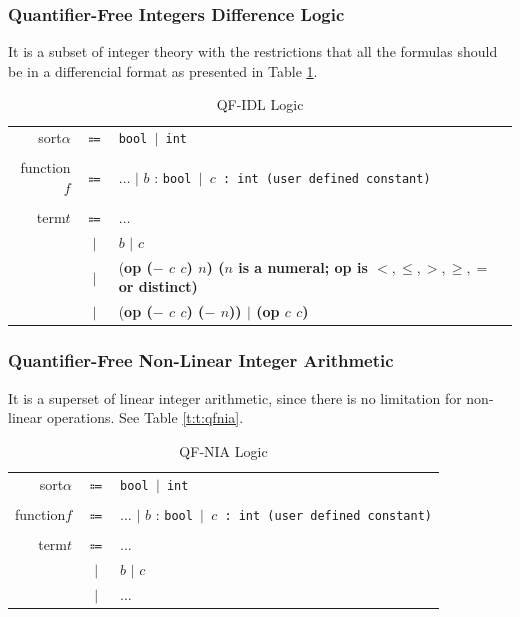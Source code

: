\documentclass[10pt,letter]{article}
\theoremstyle{definition}
\begin{document}
\subsubsection{Quantifier-Free Integers Difference Logic}
It is a subset of integer theory with the restrictions that all the formulas should be in a differencial format as presented in Table \ref{t:qfidllogic}.

\begin{table}[!h]
\begin{mdframed}
\centering
\begin{tabular}{r c l}
sort\qquad $\alpha$ & $\Coloneqq$ & \tt bool $\mid$ int\\
\\
function\qquad $f$ & $\Coloneqq$ & $\ldots$ $\mid$ \rm $b$ : \tt bool $\mid$ \rm $c$ : \tt int \qquad(\rm user defined constant)\\
\\
term\qquad $t$ & $\Coloneqq$ & $\ldots$ \\
& $\mid$ & $b$ $\mid$ $c$\\
& $\mid$ & (\bf op \rm ($-$ $c$ $c$) $n$) \qquad($n$ is a numeral; \bf op \rm is $<, \leqslant, >, \geqslant, =$ or \bf distinct\rm)\\
& $\mid$ & (\bf op \rm ($-$ $c$ $c$) ($-$ $n$)) $\mid$ (\bf op \rm $c$ $c$)\\
\end{tabular}
\end{mdframed}
\caption{QF-IDL Logic}
\label{t:qfidllogic}
\end{table}

\subsubsection{Quantifier-Free Non-Linear Integer Arithmetic}
It is a superset of linear integer arithmetic, since there is no limitation for non-linear operations. See Table \ref{t:t:qfnia}.

\begin{table}[!h]
\begin{mdframed}
\centering
\begin{tabular}{r c l}
sort\qquad $\alpha$ & $\Coloneqq$ & \tt bool $\mid$ int\\
\\
function\qquad $f$ & $\Coloneqq$ & $\ldots$ $\mid$ \rm $b$ : \tt bool $\mid$ \rm $c$ : \tt int \qquad(\rm user defined constant)\\
\\
term\qquad $t$ & $\Coloneqq$ & $\ldots$ \\
& $\mid$ & $b$ $\mid$ $c$\\
& $\mid$ & $\ldots$\\
\end{tabular}
\end{mdframed}
\caption{QF-NIA Logic}
\label{t:qfnia}
\end{table}
\end{document}
